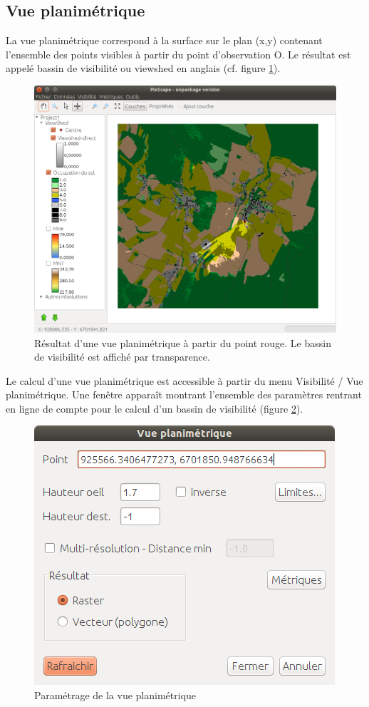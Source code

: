 \documentclass{report}
\begin{document}
\subsection{Vue planimétrique}
La vue planimétrique correspond à la surface sur le plan (x,y) contenant l'ensemble des points visibles à partir du point d'observation O. Le résultat est appelé bassin de visibilité ou viewshed en anglais (cf. figure \ref{viewshed}).

\begin{figure}[H]
	\includegraphics[scale=0.5]{img/viewshed-fr.png} 
	\caption{Résultat d'une vue planimétrique à partir du point rouge. Le bassin de visibilité est affiché par transparence.}
	\label{viewshed}
\end{figure}

Le calcul d'une vue planimétrique est accessible à partir du menu Visibilité / Vue planimétrique. Une fenêtre apparaît montrant l'ensemble des paramètres rentrant en ligne de compte pour le calcul d'un bassin de visibilité (figure \ref{viewshed_param_fig}). 

\begin{figure}[H]
	\includegraphics[scale=0.5]{img/viewshed_dlg-fr.png} 
	\caption{Paramétrage de la vue planimétrique}
	\label{viewshed_param_fig}
\end{figure}
\end{document}
